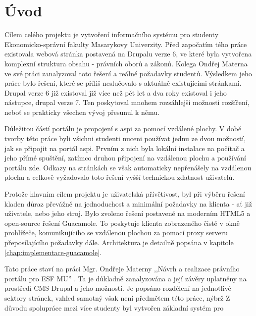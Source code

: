 \chapter{Úvod}
Cílem celého projektu je vytvoření informačního systému pro studenty Ekonomicko-správní fakulty Masarykovy Univerzity. Před započatím tého práce existovala webová stránka postavená na Drupalu verze 6, ve které byla vytvořena komplexní struktura obsahu - právních oborů a zákonů. Kolega Ondřej Materna ve své práci zanalyzoval toto řešení a reálné požadavky studentů. Výsledkem jeho práce bylo řešení, které se příliš neslučovalo s aktuálně existujícími stránkami. Drupal verze 6 již existoval již více než pět let a dva roky existoval i jeho nástupce, drupal verze 7\cite{website:wiki:drupal}. Ten poskytoval mnohem rozsáhlejší možnosti rozšíření, neboť se prakticky všechen vývoj přesunul k němu. 

Důležitou částí portálu je propojení s \gls{aspi} za pomocí vzdálené plochy. V době tvorby této práce byli všichni studenti nuceni používat jednu ze dvou možností, jak se připojit na portál \gls{aspi}. Prvním z nich byla lokální instalace na počítač a jeho přímé spuštění, zatímco druhou připojení na vzdálenou plochu a používání portálu zde. Odkazy na stránkách se však automaticky nepřenášely na vzdálenou plochu a celkově vyžadovalo toto řešení vyšší technickou zdatnost uživatelů.

Protože hlavním cílem projektu je uživatelská přívětivost, byl při výběru řešení kladen důraz převážně na jednoduchost a minimální požadavky na klienta - ať již uživatele, nebo jeho stroj. Bylo zvoleno řešení postavené na moderním HTML5 a open-source řešení Guacamole. To poskytuje klienta zobrazeného čistě v okně prohlížeče, komunikujícího se vzdálenou plochou za pomocí proxy serveru přeposílajícího požadavky dále. Architektura je detailně popsána v kapitole \ref{chap:implementace-guacamole}.

Tato práce staví na práci Mgr. Ondřeje Materny ,,Návrh a realizace právního portálu pro ESF MU'' \cite{omaterna2013}. Ta je důkladně zanalyzována a její závěry uplatněny na prostředí CMS Drupal a jeho možnosti. Je popsáno rozdělení na jednotlivé sektory stránek, vzhled samotný však není předmětem této práce, nýbrž %
Z důvodu spolupráce mezi více studenty byl vytvořen základní systém pro 

